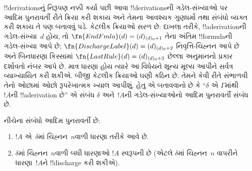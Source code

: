 \documentclass[../../../include/open-logic-section]{subfiles}
\begin{document}
\begin{explain}
!!{derivation}sનું નિરૂપણ નક્કી કર્યા પછી
આવા !!{derivation}sની ગડેલ-સંખ્યાઓ પર
આદિમ પુનરાવર્તી રીતે ક્રિયા કરી શકાય
અને તેમના આવશ્યક ગુણધર્મો તથા સંબંધો
વ્યક્ત કરી શકાય તે પણ બતાવવું પડે.
કેટલીક ક્રિયાઓ સરળ છે: દાખલા તરીકે,
!!a{derivation}ની ગડેલ-સંખ્યા~$d$ હોય,
તો $\fn{EndFmla}(d) = (d)_{(d)_0+1}$
તેના અંતિમ !!{formula}ની ગડેલ-સંખ્યા
આપે છે; $\fn{DischargeLabel}(d) = (d)_{(d)_0 + 2}$
નિવૃત્તિ-ચિહ્નન આપે છે અને બિનધારણા
કિસ્સામાં
$\fn{LastRule}(d) = (d)_{(d)_0 + 3}$
છેલ્લા અનુમાનનો પ્રકાર દર્શાવતો નંબર
આપે છે. માત્ર ધારણા હોય ત્યારે આ
વિધેયને શૂન્ય મૂલ્ય આપીને સર્વત્ર
વ્યાખ્યાયિત કરી શકીએ.
બીજી કેટલીક ક્રિયાઓ ઘણી કઠિન છે.
તેમને કેવી રીતે સંભાળવી તેનો ઓછામાં
ઓછો રૂપરેખાત્મક ખ્યાલ આપીશું. હેતુ
એ બતાવવાનો છે કે ``$\delta$ એ
$\Gamma$માંથી~$!A$ની
!!a{derivation} છે'' એ સંબંધ
$\delta$ અને~$!A$ની ગડેલ-સંખ્યાઓનો
આદિમ પુનરાવર્તી સંબંધ છે.
\end{explain}

\begin{prop}
  નીચેના સંબંધો આદિમ પુનરાવર્તી છે:
  \begin{enumerate}
  \item $!A$ એ~$\delta$માં
    ચિહ્નન~$n$વાળી ધારણા તરીકે આવે છે.
  \item $\delta$માં ચિહ્નન~$n$વાળી
    બધી ધારણાઓ $!A$ સ્વરૂપની છે
    (એટલે $\delta$માં ચિહ્નન~$n$
    વાપરીને ધારણા~$!A$ને
    !!{discharge} કરી શકીએ).
  \end{enumerate}
\end{prop}
\end{document}
